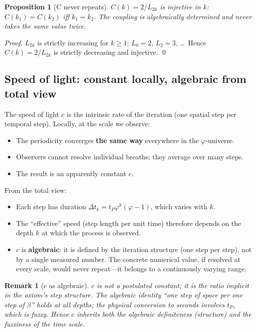 \documentclass[12pt,a4paper]{article}
\newtheorem{proposition}[theorem]{Proposition}
\newtheorem{remark}[theorem]{Remark}
\begin{document}
\begin{proposition}[C never repeats]
\label{prop:C-never-repeats}
$C(k) = 2/L_{2k}$ is injective in $k$: $C(k_1) = C(k_2)$ iff $k_1 = k_2$. The coupling is algebraically determined and never takes the same value twice.
\end{proposition}

\begin{proof}
$L_{2k}$ is strictly increasing for $k \geq 1$; $L_0 = 2$, $L_2 = 3$, \ldots\ Hence $C(k) = 2/L_{2k}$ is strictly decreasing and injective. \qed
\end{proof}

\subsection{Speed of light: constant locally, algebraic from total view}

The speed of light $c$ is the intrinsic rate of the iteration (one spatial step per temporal step). Locally, at the scale we observe:
\begin{itemize}[nosep]
\item The periodicity converges \textbf{the same way} everywhere in the $\varphi$-universe.
\item Observers cannot resolve individual breaths; they average over many steps.
\item The result is an apparently constant $c$.
\end{itemize}

From the total view:
\begin{itemize}[nosep]
\item Each step has duration $\Delta t_k = t_P\varphi^k(\varphi-1)$, which varies with $k$.
\item The ``effective'' speed (step length per unit time) therefore depends on the depth $k$ at which the process is observed.
\item $c$ is \textbf{algebraic}: it is defined by the iteration structure (one step per step), not by a single measured number. The concrete numerical value, if resolved at every scale, would never repeat---it belongs to a continuously varying range.
\end{itemize}

\begin{remark}[c as algebraic]
\label{rem:c-algebraic}
$c$ is not a postulated constant; it is the ratio implicit in the axiom's step structure. The algebraic identity ``one step of space per one step of $\beta$'' holds at all depths; the physical conversion to seconds involves $t_P$, which is fuzzy. Hence $c$ inherits both the algebraic definiteness (structure) and the fuzziness of the time scale.
\end{remark}
\end{document}
